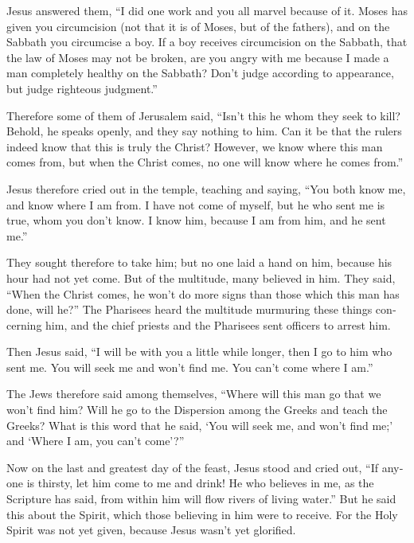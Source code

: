\begin{paracol}{2}
\begin{otherlanguage}{english}
 Jesus answered them, ``I did one work and you all marvel
because of it.  Moses has given you circumcision (not
that it is of Moses, but of the fathers), and on the Sabbath you
circumcise a boy.  If a boy receives circumcision on the
Sabbath, that the law of Moses may not be broken, are you angry with me
because I made a man completely healthy on the Sabbath? 
Don't judge according to appearance, but judge righteous judgment.''

 Therefore some of them of Jerusalem said, ``Isn't this
he whom they seek to kill?  Behold, he speaks openly, and
they say nothing to him. Can it be that the rulers indeed know that this
is truly the Christ?  However, we know where this man
comes from, but when the Christ comes, no one will know where he comes
from.''

 Jesus therefore cried out in the temple, teaching and
saying, ``You both know me, and know where I am from. I have not come of
myself, but he who sent me is true, whom you don't know. 
I know him, because I am from him, and he sent me.''

 They sought therefore to take him; but no one laid a
hand on him, because his hour had not yet come.  But of
the multitude, many believed in him. They said, ``When the Christ comes,
he won't do more signs than those which this man has done, will he?''
 The Pharisees heard the multitude murmuring these things
concerning him, and the chief priests and the Pharisees sent officers to
arrest him.

 Then Jesus said, ``I will be with you a little while
longer, then I go to him who sent me.  You will seek me
and won't find me. You can't come where I am.''

 The Jews therefore said among themselves, ``Where will
this man go that we won't find him? Will he go to the Dispersion among
the Greeks and teach the Greeks?  What is this word that
he said, `You will seek me, and won't find me;' and `Where I am, you
can't come'?''

 Now on the last and greatest day of the feast, Jesus
stood and cried out, ``If anyone is thirsty, let him come to me and
drink!  He who believes in me, as the Scripture has said,
from within him will flow rivers of living water.''  But
he said this about the Spirit, which those believing in him were to
receive. For the Holy Spirit was not yet given, because Jesus wasn't yet
glorified.


\end{otherlanguage}
\end{paracol}
